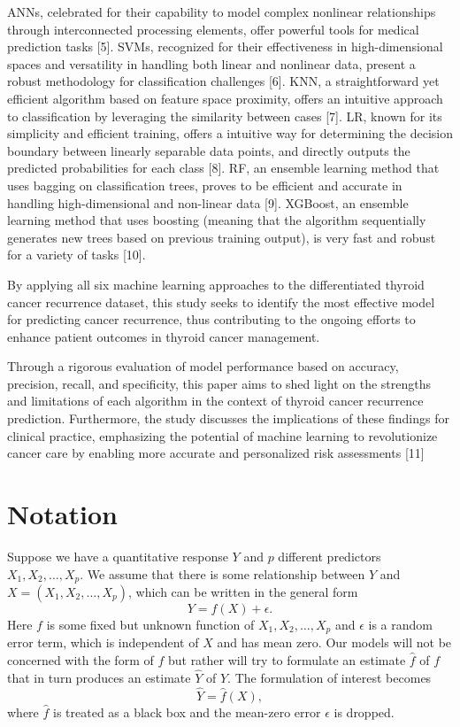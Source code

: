 \documentclass[
  letterpaper,
  DIV=11,
  numbers=noendperiod]{scrartcl}
\begin{document}
ANNs, celebrated for their capability to model complex nonlinear
relationships through interconnected processing elements, offer powerful
tools for medical prediction tasks {[}5{]}. SVMs, recognized for their
effectiveness in high-dimensional spaces and versatility in handling
both linear and nonlinear data, present a robust methodology for
classification challenges {[}6{]}. KNN, a straightforward yet efficient
algorithm based on feature space proximity, offers an intuitive approach
to classification by leveraging the similarity between cases {[}7{]}.
LR, known for its simplicity and efficient training, offers a intuitive
way for determining the decision boundary between linearly separable
data points, and directly outputs the predicted probabilities for each
class {[}8{]}. RF, an ensemble learning method that uses bagging on
classification trees, proves to be efficient and accurate in handling
high-dimensional and non-linear data {[}9{]}. XGBoost, an ensemble
learning method that uses boosting (meaning that the algorithm
sequentially generates new trees based on previous training output), is
very fast and robust for a variety of tasks {[}10{]}.

By applying all six machine learning approaches to the differentiated
thyroid cancer recurrence dataset, this study seeks to identify the most
effective model for predicting cancer recurrence, thus contributing to
the ongoing efforts to enhance patient outcomes in thyroid cancer
management.

Through a rigorous evaluation of model performance based on accuracy,
precision, recall, and specificity, this paper aims to shed light on the
strengths and limitations of each algorithm in the context of thyroid
cancer recurrence prediction. Furthermore, the study discusses the
implications of these findings for clinical practice, emphasizing the
potential of machine learning to revolutionize cancer care by enabling
more accurate and personalized risk assessments {[}11{]}

\section{Notation}\label{notation}

Suppose we have a quantitative response \(Y\) and \(p\) different
predictors \(X_1, X_2, \dots, X_p\). We assume that there is some
relationship between \(Y\) and \(X = (X_1, X_2, \dots, X_p)\), which can
be written in the general form \[Y = f(X) + \epsilon.\] Here \(f\) is
some fixed but unknown function of \(X_1, X_2, \dots, X_p\) and
\(\epsilon\) is a random error term, which is independent of \(X\) and
has mean zero. Our models will not be concerned with the form of \(f\)
but rather will try to formulate an estimate \(\hat{f}\) of \(f\) that
in turn produces an estimate \(\hat{Y}\) of \(Y\). The formulation of
interest becomes \[\hat{Y} = \hat{f}(X),\] where \(\hat{f}\) is treated
as a black box and the mean-zero error \(\epsilon\) is dropped.
\end{document}
